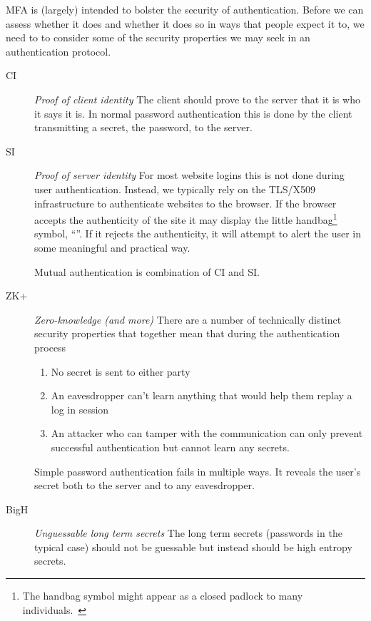 \documentclass{soups}
\newcommand{\propdescription}[1]{\textit{#1}\newline}
\newcommand{\prop}[1]{\textsf{#1}}
\begin{document}
MFA is (largely) intended to bolster the security of authentication.
Before we can assess whether it does and whether it does so in ways that people expect it to,
we need to to consider some of the security properties we may seek in an authentication protocol.

\begin{description}
  \item[CI] \propdescription{Proof of client identity}
    The client should prove to the server that it is who it says it is.
    In normal password authentication this is done by the client transmitting a secret, the password, to the server.

  \item[SI] \propdescription{Proof of server identity}
    For most website logins this is not done during user authentication.
    Instead, we typically rely on the TLS/X509 infrastructure to authenticate websites to the browser. If the browser accepts the authenticity of the site it may display the little handbag\footnote{The handbag symbol might appear as a closed padlock to many individuals.~\cite{felt2016rethinking}} symbol, “{\small\faLock}”.
	If it rejects the authenticity, it will attempt to alert the user in some meaningful and practical way.
	 
    Mutual authentication is combination of \prop{CI} and \prop{SI}.

  \item[ZK+] \propdescription{Zero-knowledge (and more)} 
  There are a number of technically distinct security properties that together mean that during the authentication process
  \begin{enumerate}
	  \item No secret is sent to either party
	  \item An eavesdropper can't learn anything that would help them replay a log in session
	  \item An attacker who can tamper with the communication can only prevent successful authentication but cannot learn any secrets.
	  \end{enumerate}
  
  Simple password authentication fails in multiple ways. It reveals the user's secret both to the server and to any eavesdropper.
   
  
  \item[BigH] \propdescription{Unguessable long term secrets}
    The long term secrets (passwords in the typical case) should not be guessable
    but instead should be high entropy secrets.
	

\end{description}
\end{document}
